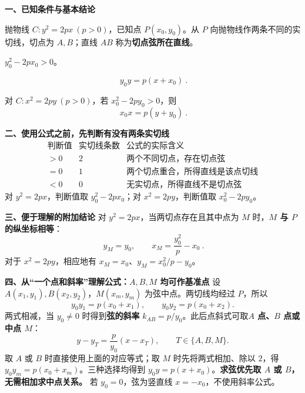 \begin{statementbox}
\par\smallskip\begin{center}\end{center}\par\smallskip

\textbf{\textcolor{CStatement}{一、已知条件与基本结论}}
\begin{description}[style=nextline, leftmargin=2.8em, labelsep=0.5em, itemsep=0.4em]
  \item[\textbf{条件：}] 抛物线 $C:y^2=2px\ (p>0)$，已知点 $P(x_0,y_0)$。从 $P$ 向抛物线作两条不同的实切线，切点为 $A,B$；直线 $AB$ 称为\textbf{切点弦所在直线}。
  \item[\textbf{两切点存在的充要条件：}] $y_0^2-2px_0>0$。
  \item[\textbf{结论一（$y^2$ 型）：}]
  \[
     \boxed{\ y_0y=p(x+x_0)\ }.
  \]
  \item[\textbf{结论二（$x^2$ 型）：}] 对 $C:x^2=2py\ (p>0)$，若 $x_0^2-2py_0>0$，则
  \[
     \boxed{\ x_0x=p(y+y_0)\ }.
  \]
\end{description}

\medskip
\textbf{\textcolor{CStatement}{二、使用公式之前，先判断有没有两条实切线}}
\[
\begin{array}{c|c|c}
\text{判断值} & \text{实切线条数} & \text{公式的实际含义}\\ \hline
>0 & 2 & \text{两个不同切点，存在切点弦}\\
=0 & 1 & \text{两个切点重合，所得直线是该点切线}\\
<0 & 0 & \text{无实切点，所得直线不是切点弦}
\end{array}
\]
对 $y^2=2px$，判断值取 $y_0^2-2px_0$；对 $x^2=2py$，判断值取 $x_0^2-2py_0$。

\medskip
\textbf{\textcolor{CStatement}{三、便于理解的附加结论}}
对 $y^2=2px$，当两切点存在且其中点为 $M$ 时，\textbf{$M$ 与 $P$ 的纵坐标相等}：
\[
  \boxed{\ y_M=y_0,\qquad x_M=\frac{y_0^2}{p}-x_0\ }.
\]
对于 $x^2=2py$，相应地有 $x_M=x_0$、$y_M=x_0^2/p-y_0$。

\medskip
\textbf{\textcolor{CStatement}{四、从“一个点和斜率”理解公式：$A,B,M$ 均可作基准点}}
设 $A(x_1,y_1),B(x_2,y_2)$，$M(x_m,y_m)$ 为弦中点。两切线均经过 $P$，所以
\[
 y_0y_1=p(x_0+x_1),\qquad y_0y_2=p(x_0+x_2).
\]
两式相减，当 $y_0\ne0$ 时得到\textbf{弦的斜率} $k_{AB}=p/y_0$。此后点斜式可取\textbf{$A$ 点、$B$ 点或中点 $M$}：
\[
 y-y_T=\frac p{y_0}(x-x_T),\qquad T\in\{A,B,M\}.
\]
取 $A$ 或 $B$ 时直接使用上面的对应等式；取 $M$ 时先将两式相加、除以 $2$，得 $y_0y_m=p(x_0+x_m)$。三种选择均得到 $\boxed{y_0y=p(x+x_0)}$。\textbf{求弦优先取 $A$ 或 $B$，无需相加求中点关系。} 若 $y_0=0$，弦为竖直线 $x=-x_0$，不使用斜率公式。

\end{statementbox}

